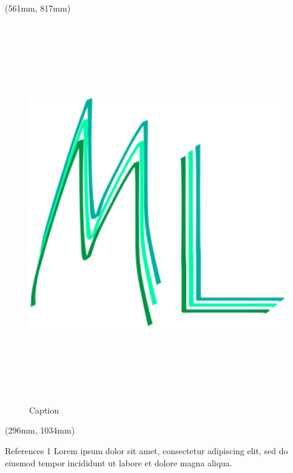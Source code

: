 \documentclass{beamer}
\begin{document}
\begin{frame}
    \begin{textblock*}{249mm}(561mm, 817mm)
        \begin{minipage}[t][165mm][t]{\textwidth}
            \begin{figure}
                \centering
                \includegraphics[width=\textwidth, height=165mm, keepaspectratio]{images/logo-ml.png}
                \caption{Caption}
                \label{fig:subfigure2}
            \end{figure}
        \end{minipage}
    \end{textblock*}
    
    \begin{textblock*}{249mm}(296mm, 1034mm)
        \begin{minipage}[t][50mm][t]{\textwidth}
            \begin{block}{\small References 1}
                \small Lorem ipsum dolor sit amet, consectetur adipiscing elit, sed do eiusmod tempor incididunt ut labore et dolore magna aliqua.
            \end{block}
        \end{minipage}
    \end{textblock*}
    

\end{frame}
\end{document}
